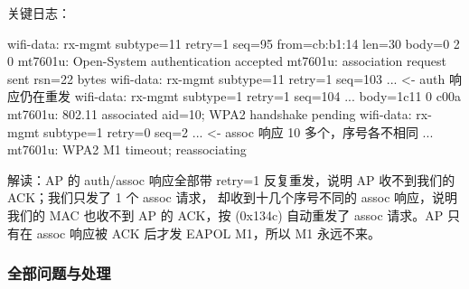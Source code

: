 关键日志：

\begin{dbglog}
wifi-data: rx-mgmt subtype=11 retry=1 seq=95  from=cb:b1:14 len=30 body=0 2 0
mt7601u: Open-System authentication accepted
mt7601u: association request sent rsn=22 bytes
wifi-data: rx-mgmt subtype=11 retry=1 seq=103 ...      <- auth 响应仍在重发
wifi-data: rx-mgmt subtype=1  retry=1 seq=104 ... body=1c11 0 c00a
mt7601u: 802.11 associated aid=10; WPA2 handshake pending
wifi-data: rx-mgmt subtype=1  retry=0 seq=2 ...        <- assoc 响应 10 多个，序号各不相同
...
mt7601u: WPA2 M1 timeout; reassociating
\end{dbglog}

解读：AP 的 auth/assoc 响应全部带 retry=1 反复重发，说明 AP 收不到我们的 ACK；我们只发了 1 个 assoc 请求，
却收到十几个序号不同的 assoc 响应，说明我们的 MAC 也收不到 AP 的 ACK，按 (0x134c)
自动重发了 assoc 请求。AP 只有在 assoc 响应被 ACK 后才发 EAPOL M1，所以 M1 永远不来。

\subsubsection{全部问题与处理}

